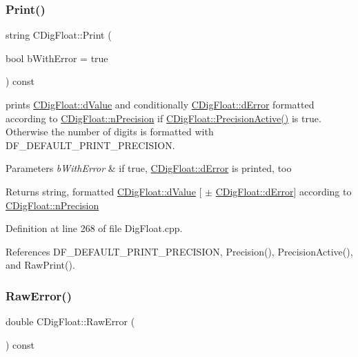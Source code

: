 \subsubsection{\texorpdfstring{Print()}{Print()}}
{\footnotesize\ttfamily string C\+Dig\+Float\+::\+Print (\begin{DoxyParamCaption}\item[{bool}]{b\+With\+Error = {\ttfamily true} }\end{DoxyParamCaption}) const}



prints \hyperlink{classCDigFloat_a4bbe69e30dd4e20527362493aa9aaf96}{C\+Dig\+Float\+::d\+Value} and conditionally \hyperlink{classCDigFloat_a25eb3782d1e727ff007a48f8308e3d4d}{C\+Dig\+Float\+::d\+Error} formatted according to \hyperlink{classCDigFloat_ad580654be35246d14c91482581c0bc11}{C\+Dig\+Float\+::n\+Precision} if \hyperlink{classCDigFloat_ad1f2365630c9e35e77c01093e73440c4}{C\+Dig\+Float\+::\+Precision\+Active()} is true. Otherwise the number of digits is formatted with D\+F\+\_\+\+D\+E\+F\+A\+U\+L\+T\+\_\+\+P\+R\+I\+N\+T\+\_\+\+P\+R\+E\+C\+I\+S\+I\+ON. 


\begin{DoxyParams}{Parameters}
{\em b\+With\+Error} & if true, \hyperlink{classCDigFloat_a25eb3782d1e727ff007a48f8308e3d4d}{C\+Dig\+Float\+::d\+Error} is printed, too \\
\hline
\end{DoxyParams}
\begin{DoxyReturn}{Returns}
string, formatted \hyperlink{classCDigFloat_a4bbe69e30dd4e20527362493aa9aaf96}{C\+Dig\+Float\+::d\+Value} \mbox{[} $\pm$ \hyperlink{classCDigFloat_a25eb3782d1e727ff007a48f8308e3d4d}{C\+Dig\+Float\+::d\+Error}\mbox{]} according to \hyperlink{classCDigFloat_ad580654be35246d14c91482581c0bc11}{C\+Dig\+Float\+::n\+Precision} 
\end{DoxyReturn}


Definition at line 268 of file Dig\+Float.\+cpp.



References D\+F\+\_\+\+D\+E\+F\+A\+U\+L\+T\+\_\+\+P\+R\+I\+N\+T\+\_\+\+P\+R\+E\+C\+I\+S\+I\+ON, Precision(), Precision\+Active(), and Raw\+Print().

\mbox{\label{classCDigFloat_a996749023353bd1df0ab41a2a11e2ee7}} 
\subsubsection{\texorpdfstring{Raw\+Error()}{RawError()}}
{\footnotesize\ttfamily double C\+Dig\+Float\+::\+Raw\+Error (\begin{DoxyParamCaption}{ }\end{DoxyParamCaption}) const\hspace{0.3cm}{\ttfamily [inline]}}



